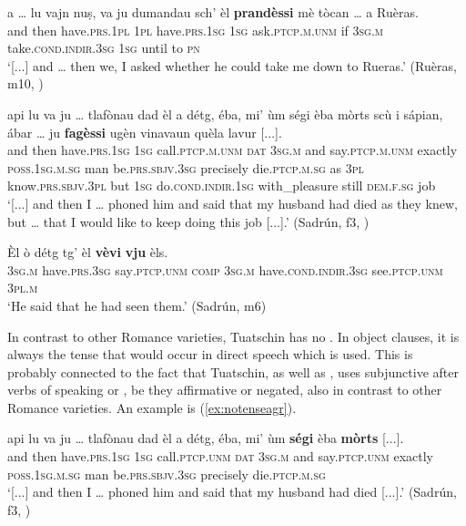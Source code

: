 \ea
\label{ex:cond.indir1}
\gll  [...]  a … lu vajn nuṣ, va ju dumandau sch’ èl \textbf{prandèssi} mè tòcan … a Ruèras. \\
{} and {} then have.\textsc{prs.1pl} \textsc{1pl} have.\textsc{prs.1sg}  \textsc{1sg} ask.\textsc{ptcp.m.unm} if \textsc{3sg.m} take.\textsc{cond.indir.3sg} \textsc{1sg} until {} to \textsc{pn}\\
\glt `[...] and … then we, I asked whether he could take me down to Rueras.' (Ruèras, m10, )
\z

\ea
\label{ex:cond.indir2}
\gll  [...] api lu va ju … tlafònau dad èl a détg, éba, mi' ùm ségi èba mòrts scù i sápian, ábar … ju \textbf{fagèssi} ugèn vinavaun quèla lavur [...].  \\
{} and then have.\textsc{prs.1sg} \textsc{1sg} {} call.\textsc{ptcp.m.unm} \textsc{dat} \textsc{3sg.m} and say.\textsc{ptcp.m.unm} exactly \textsc{poss.1sg.m.sg} man be.\textsc{prs.sbjv.3sg} precisely die.\textsc{ptcp.m.sg} as \textsc{3pl} know.\textsc{prs.sbjv.3pl} but {} \textsc{1sg} do.\textsc{cond.indir.1sg} with\_pleasure still \textsc{dem.f.sg} job\\ 
\glt `[...] and then I … phoned him and said that my husband had died as they knew, but … that I would like to keep doing this job [...].' (Sadrún, f3, )
\z


\ea
\label{ex:cond.indir3}
\gll Èl ò détg tg' èl \textbf{vèvi} \textbf{vju} èls.\\
 \textsc{3sg.m} have.\textsc{prs.3sg} say\textsc{.ptcp.unm} \textsc{comp} \textsc{3sg.m} have.\textsc{cond.indir.3sg} see.\textsc{ptcp.unm} \textsc{3pl.m}\\
 \glt `He said that he had seen them.' (Sadrún, m6)
 \z


\label{sec:4.1.2.2.11}
In contrast to other Romance varieties, Tuatschin has no . In object clauses, it is always the tense that would occur in direct speech which is used. This is probably connected to the fact that Tuatschin, as well as , uses subjunctive after verbs of speaking or , be they affirmative or negated, also in contrast to other Romance varieties. An example is (\ref{ex:notenseagr}).

\ea
\label{ex:notenseagr}
\gll  [...] api lu va ju … tlafònau dad èl a détg, éba, mi' ùm \textbf{ségi} èba \textbf{mòrts} [...]. \\
{} and then have.\textsc{prs.1sg} \textsc{1sg} {} call.\textsc{ptcp.unm} \textsc{dat} \textsc{3sg.m} and say.\textsc{ptcp.unm} exactly \textsc{poss.1sg.m.sg} man be.\textsc{prs.sbjv.3sg} precisely die.\textsc{ptcp.m.sg} \\ 
\glt `[...] and then I … phoned him and said that my husband had died [...].' (Sadrún, f3, )
\z

